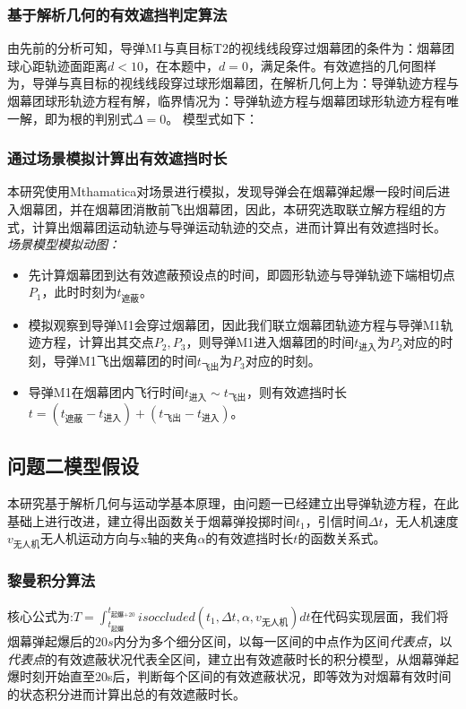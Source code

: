 \documentclass{article}
\begin{document}
\subsubsection{基于解析几何的有效遮挡判定算法}

由先前的分析可知，导弹M1与真目标T2的视线线段穿过烟幕团的条件为：烟幕团球心距轨迹面距离$d<10$，在本题中，$d = 0$，满足条件。有效遮挡的几何图样为，导弹与真目标的视线线段穿过球形烟幕团，在解析几何上为：导弹轨迹方程与烟幕团球形轨迹方程有解，临界情况为：导弹轨迹方程与烟幕团球形轨迹方程有唯一解，即为根的判别式$\Delta  = 0$。
模型式如下：
\subsubsection{通过场景模拟计算出有效遮挡时长}
本研究使用Mthamatica对场景进行模拟，发现导弹会在烟幕弹起爆一段时间后进入烟幕团，并在烟幕团消散前飞出烟幕团，因此，本研究选取联立解方程组的方式，计算出烟幕团运动轨迹与导弹运动轨迹的交点，进而计算出有效遮挡时长。
\textit{场景模型模拟动图：}

\begin{itemize}
    \item 先计算烟幕团到达有效遮蔽预设点的时间，即圆形轨迹与导弹轨迹下端相切点$P_1$，此时时刻为$t_\text{遮蔽}$。
    \item 模拟观察到导弹M1会穿过烟幕团，因此我们联立烟幕团轨迹方程与导弹M1轨迹方程，计算出其交点$P_2,P_3$，则导弹M1进入烟幕团的时间$t_{\text{进入}}$为$P_2$对应的时刻，导弹M1飞出烟幕团的时间$t_{\text{飞出}}$为$P_3$对应的时刻。
    \item 导弹M1在烟幕团内飞行时间$t_{\text{进入}} \sim t_{\text{飞出}}$，则有效遮挡时长$t =(t_\text{遮蔽}- t_\text{进入}) + (t_{\text{飞出}} - t_{\text{进入}})$。
\end{itemize}
\subsection{问题二模型假设}
本研究基于解析几何与运动学基本原理，由问题一已经建立出导弹轨迹方程，在此基础上进行改进，建立得出函数关于烟幕弹投掷时间$t_1$，引信时间$\Delta t$，无人机速度 $v_\text{无人机}$无人机运动方向与x轴的夹角$\alpha$的有效遮挡时长$t$的函数关系式。


\subsubsection{黎曼积分算法}
核心公式为:$T = \int_{t_\text{起爆}}^{t_\text{起爆+20}}isoccluded(t_1,\Delta t , \alpha , v_\text{无人机})dt$在代码实现层面，我们将烟幕弹起爆后的$20s$内分为多个细分区间，以每一区间的中点作为区间\textit{代表点}，以\textit{代表点}的有效遮蔽状况代表全区间，建立出有效遮蔽时长的积分模型，从烟幕弹起爆时刻开始直至20s后，判断每个区间的有效遮蔽状况，即等效为对烟幕有效时间的状态积分进而计算出总的有效遮蔽时长。
\end{document}

